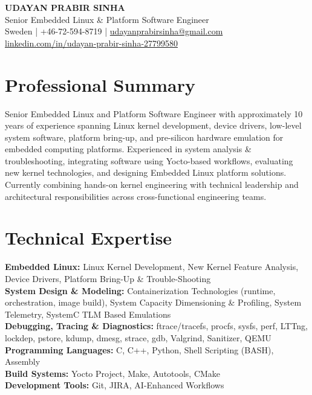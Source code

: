 \documentclass[10pt,a4paper]{article}
\newcommand{\skill}[2]{\textbf{#1:} #2\\}
\begin{document}
\begin{center}
{\LARGE\bfseries UDAYAN PRABIR SINHA}\\[4pt]
{\large\color{heading} Senior Embedded Linux \& Platform Software Engineer}\\[7pt]
Sweden \quad | \quad +46-72-594-8719 \quad | \quad \href{mailto:udayanprabirsinha@gmail.com}{udayanprabirsinha@gmail.com}\\[3pt]
\href{https://www.linkedin.com/in/udayan-prabir-sinha-27799580/}{linkedin.com/in/udayan-prabir-sinha-27799580}
\end{center}
\section{Professional Summary}
Senior Embedded Linux and Platform Software Engineer with approximately 10 years of experience spanning Linux kernel development, device drivers, low-level system software, platform bring-up, and pre-silicon hardware emulation for embedded computing platforms. Experienced in system analysis \& troubleshooting, integrating software using Yocto-based workflows, evaluating new kernel technologies, and designing Embedded Linux platform solutions. Currently combining hands-on kernel engineering with technical leadership and architectural responsibilities across cross-functional engineering teams.
\section{Technical Expertise}
\skill{Embedded Linux}{Linux Kernel Development, New Kernel Feature Analysis, Device Drivers, Platform Bring-Up \& Trouble-Shooting}
\skill{System Design \& Modeling}{Containerization Technologies (runtime, orchestration, image build), System Capacity Dimensioning \& Profiling, System Telemetry, SystemC TLM Based Emulations}
\skill{Debugging, Tracing \& Diagnostics}{ftrace/tracefs, procfs, sysfs, perf, LTTng, lockdep, pstore, kdump, dmesg, strace, gdb, Valgrind, Sanitizer, QEMU}
\skill{Programming Languages}{C, C++, Python, Shell Scripting (BASH), Assembly}
\skill{Build Systems}{Yocto Project, Make, Autotools, CMake}
\skill{Development Tools}{Git, JIRA, AI-Enhanced Workflows}
\end{document}

